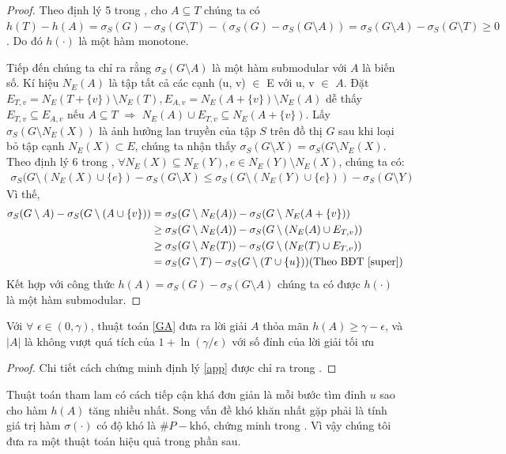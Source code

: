 \begin{proof}	
	Theo định lý 5 trong \cite{khali}, cho $A \subseteq T$ chúng ta có $h(T)-h(A)=\sigma_S(G) - \sigma_S(G \setminus T) -(\sigma_S(G) - \sigma_S(G \setminus A))  =\sigma_{S}(G \setminus A)- \sigma_{S}(G \setminus T) \geq 0$. Do đó $h(\cdot)$ là một hàm monotone. 
	
	Tiếp đến chúng ta chỉ ra rằng $\sigma_S(G \setminus A)$ là một hàm submodular với $A$ là biến số. Kí hiệu $N_E(A)$ là tập tất cả các cạnh (u, v) $\in$ E với u, v $\in$ $A$. Đặt $E_{T, v}=N_E(T+\{v\})\setminus N_E(T), E_{A, v}= N_E(A+\{v\}) \setminus N_E(A)$ dễ thấy $E_{T, v} \subseteq E_{A, v}$  nếu $A \subseteq T$ $\Rightarrow$ $N_E(A)\cup E_{T, v} \subseteq N_E(A+ \{v\})$. Lấy $\sigma_S(G \setminus N_E(X))$ là ảnh hưởng lan truyền của tập $S$ trên đồ thị $G$ sau khi loại bỏ tập cạnh $N_E(X) \subset E$, chúng ta nhận thấy $\sigma_{S}(G \setminus X)=\sigma_{S}(G \setminus N_E(X)$. Theo định lý 6 trong \cite{khali}, $\forall N_E(X) \subseteq N_E(Y), e \in N_E(Y)\setminus N_E(X)$, chúng ta có: 
	\begin{align}
	\sigma_{S}(G \setminus (N_E(X) \cup \{e\}) - \sigma_{S}(G \setminus X) 
	\leq \sigma_{S}(G \setminus (N_E(Y) \cup \{e\})) - \sigma_{S}(G \setminus Y)
	\label{super}
	\end{align}
	Vì thế,
	\begin{align}
	\sigma_{S}(G \setminus A)-\sigma_{S}(G \setminus (A \cup \{v\})) 
	& =\sigma_{S}(G \setminus N_E(A))-\sigma_{S}(G \setminus N_E(A+\{v\})) 
	\\
	&	\geq \sigma_{S}(G \setminus N_E(A))-\sigma_{S}(G \setminus (N_E(A) \cup E_{T, v})) 
	\\
	&	\geq \sigma_{S}(G \setminus N_E(T))-\sigma_{S}(G \setminus (N_E(T) \cup E_{T, v}))  
	\\
	& = \sigma_{S}(G\setminus T)-\sigma_{S}(G \setminus (T \cup \{u\}))  (\mbox{Theo BĐT \eqref{super}})
	\end{align}
	Kết hợp với công thức $h(A)= \sigma_S(G)- \sigma_S(G\setminus A)$ chúng ta có được $h(\cdot)$ là một hàm submodular.
\end{proof}

\begin{theo} Với $\forall$ $\epsilon \in (0, \gamma)$, thuật toán \ref{GA} đưa ra lời giải $A$ thỏa mãn $h(A) \geq \gamma- \epsilon$, và $|A|$ là không vượt quá tích của $1+\ln(\gamma/ \epsilon)$ với số đỉnh của lời giải tối ưu \label{app}
\end{theo}		
\begin{proof}
	Chi tiết cách chứng minh định lý \ref{app} được chỉ ra trong \cite{snam}. 
\end{proof}
Thuật toán tham lam có cách tiếp cận khá đơn giản là mỗi bước tìm đỉnh $u$ sao cho hàm $h(A)$ tăng nhiều nhất. Song vấn đề khó khăn nhất gặp phải là tính giá trị hàm $\sigma(\cdot)$ có độ khó là $\#P-\text{khó}$, chứng minh trong \cite{vali}. Vì vậy chúng tôi đưa ra một thuật toán hiệu quả trong phần sau.

